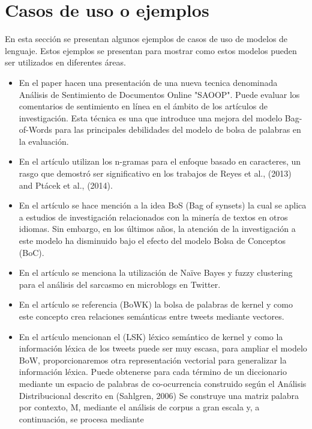 \documentclass[12pt, conference]{IEEEtran}
\begin{document}
\section{Casos de uso o ejemplos}

En esta sección se presentan algunos ejemplos de casos de uso de modelos de lenguaje. Estos ejemplos se presentan para mostrar como estos modelos pueden ser utilizados en diferentes áreas.

\begin{itemize}
  
\item En el paper \cite{r1} hacen una presentación de una nueva tecnica denominada Análisis de Sentimiento de Documentos Online "SAOOP". 
Puede evaluar los comentarios de sentimiento en línea en el ámbito de los artículos de investigación.
Esta técnica es una que introduce una mejora del modelo Bag-of-Words para las
principales debilidades del modelo de bolsa de palabras en la evaluación.
\item En el artículo \cite{r2}  utilizan los n-gramas para el enfoque basado en caracteres, un rasgo que demostró ser significativo
en los trabajos de Reyes et al., (2013) and Ptácek et al., (2014).
\item En el artículo \cite{r3} se hace mención a la idea BoS (Bag of synsets) la cual se aplica
a estudios de investigación relacionados con la minería de textos en otros idiomas. Sin embargo, en los
últimos años, la atención de la investigación a este modelo ha disminuido bajo el efecto del modelo Bolsa de
Conceptos (BoC).
\item En el artículo \cite{r4} se menciona la utilización de Naïve Bayes y fuzzy clustering para el
análisis del sarcasmo en microblogs en Twitter.
\item En el artículo \cite{r5} se referencia (BoWK) la bolsa de palabras de kernel y como este concepto 
crea relaciones semánticas entre tweets mediante vectores.
\item En el artículo \cite{r6} mencionan el (LSK) léxico semántico de kernel y como la información
 léxica de los tweets puede ser muy escasa, para ampliar el modelo BoW, proporcionaremos
 otra representación vectorial
 para generalizar la información léxica. Puede obtenerse para cada término de un diccionario mediante un
 espacio de palabras de co-ocurrencia construido según el Análisis Distribucional descrito en (Sahlgren, 2006)
 Se construye una matriz palabra por contexto, M, mediante el análisis de corpus a gran escala y, a continuación, se procesa mediante

\end{itemize}
\end{document}
